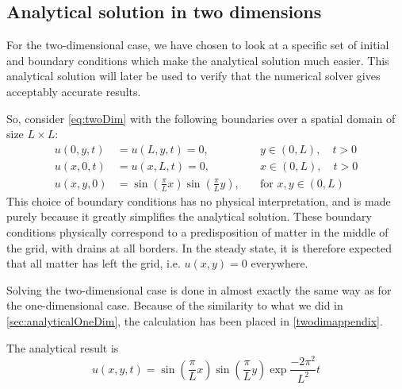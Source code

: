 \subsection{Analytical solution in two dimensions}
For the two-dimensional case, we have chosen to look at a specific set of initial and boundary conditions which make the analytical solution much easier. This analytical solution will later be used to verify that the numerical solver gives acceptably accurate results.

So, consider \vref{eq:twoDim} with the following boundaries over a spatial domain of size \(L \times L\):
\begin{equation} \label{eq:twoDimBoundaries}
\begin{aligned}
u(0,y,t) &= u(L,y,t) = 0, \quad &y \in (0,L),\quad t > 0 \\
u(x,0,t) &= u(x,L,t) = 0, \quad &x \in (0,L),\quad t > 0 \\
u(x,y,0) &= \sin(\frac{\pi}{L}x)\sin(\frac{\pi}{L}y), \quad&\text{for }x,y\in (0,L)
\end{aligned}
\end{equation}
This choice of boundary conditions has no physical interpretation, and is made purely because it greatly simplifies the analytical solution. These boundary conditions physically correspond to a predisposition of matter in the middle of the grid, with drains at all borders. In the steady state, it is therefore expected that all matter has left the grid, i.e. \(u(x,y)=0\) everywhere.

Solving the two-dimensional case is done in almost exactly the same way as for the one-dimensional case. Because of the similarity to what we did in \vref{sec:analyticalOneDim}, the calculation has been placed in \ref{twodimappendix}.

The analytical result is
\begin{equation} \label{eq:analyticalSolutionTwoDim}
u(x,y,t) = \sin(\frac{\pi}{L}x)\sin(\frac{\pi}{L}y)\exp{\frac{-2\pi^2}{L^2}t}
\end{equation}
